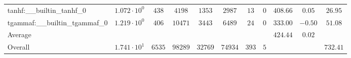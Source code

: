 \begin{tabular}{|l|c|c|c|c|c|c|c|c|c|c|}
tanhf:\_\_builtin\_tanhf\_0               & $ 1.072 \cdot 10^{0}  $ & $ 438    $ & $ 4198  $ & $ 1353  $ & $ 2987  $ & $ 13  $ & $ 0 $ & $ 408.66      $ & $ 0.05    $ & $ 26.95   $ \\
tgammaf:\_\_builtin\_tgammaf\_0           & $ 1.219 \cdot 10^{0}  $ & $ 406    $ & $ 10471 $ & $ 3443  $ & $ 6489  $ & $ 24  $ & $ 0 $ & $ 333.00      $ & $ -0.50   $ & $ 51.08   $ \\
\hline
Average                                   & $                     $ & $        $ & $       $ & $       $ & $       $ & $     $ & $   $ & $ 424.44      $ & $ 0.02    $ & $         $ \\
\hline
Overall                                   & $ 1.741 \cdot 10^{1}  $ & $ 6535   $ & $ 98289 $ & $ 32769 $ & $ 74934 $ & $ 393 $ & $ 5 $ & $             $ & $         $ & $ 732.41  $ \\
\hline
\end{tabular}
